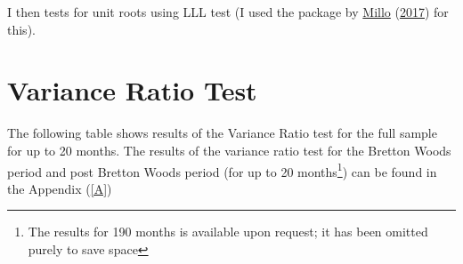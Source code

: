 \documentclass[11pt,preprint, authoryear]{elsarticle}
\numberwithin{equation}{section}
\numberwithin{figure}{section}
\numberwithin{table}{section}
\let\rmarkdownfootnote\footnote%
\def\footnote{\protect\rmarkdownfootnote}
\begin{document}
I then tests for unit roots using LLL test (I used the package by
\protect\hyperlink{ref-plm}{Millo} (\protect\hyperlink{ref-plm}{2017})
for this).

\hypertarget{variance-ratio-test}{%
\section{\texorpdfstring{Variance Ratio Test
\label{Var}}{Variance Ratio Test }}\label{variance-ratio-test}}

The following table shows results of the Variance Ratio test for the
full sample for up to 20 months. The results of the variance ratio test
for the Bretton Woods period and post Bretton Woods period (for up to 20
months\footnote{The results for 190 months is available upon request; it
  has been omitted purely to save space}) can be found in the Appendix
(\ref{A})
\end{document}
